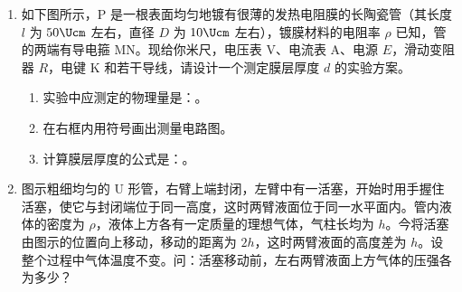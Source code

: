 \documentclass[\gkver]{gaokaozhenti}
\begin{document}
\begin{enumerate}
\item
如下图所示，P 是一根表面均匀地镀有很薄的发热电阻膜的长陶瓷管（其长度 $l$ 为 $50\Ucm$ 左右，直径 $D$ 为 $10\Ucm$ 左右），镀膜材料的电阻率 $\rho$ 已知，管的两端有导电箍 MN。现给你米尺，电压表 V、电流表 A、电源 $E$，滑动变阻器 $R$，电键 K 和若干导线，请设计一个测定膜层厚度 $d$ 的实验方案。
\begin{enumerate}
	\item
	实验中应测定的物理量是：。
	\item
	在右框内用符号画出测量电路图。
	\item
	计算膜层厚度的公式是：。
\end{enumerate}
\onepicture[w=5.5cm, align=right]{}

\item
图示粗细均匀的 U 形管，右臂上端封闭，左臂中有一活塞，开始时用手握住活塞，使它与封闭端位于同一高度，这时两臂液面位于同一水平面内。管内液体的密度为 $\rho$，液体上方各有一定质量的理想气体，气柱长均为 $h$。今将活塞由图示的位置向上移动，移动的距离为 $2h$，这时两臂液面的高度差为 $h$。设整个过程中气体温度不变。问：活塞移动前，左右两臂液面上方气体的压强各为多少？
\onepicture[h=5.5cm, align=right]{}
\end{enumerate}
\end{document}
